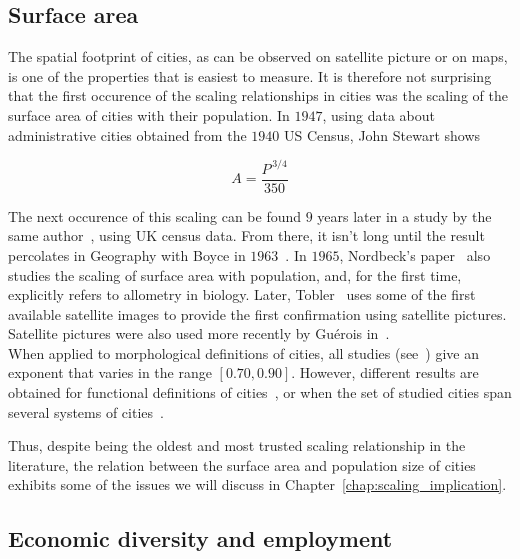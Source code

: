 \subsection{Surface area}
\label{sub:surface_area}

The spatial footprint of cities, as can be observed on satellite picture or on
maps, is one of the properties that is easiest to measure. It is therefore not
surprising that the first occurence of the scaling relationships in cities was
the scaling of the surface area of cities with their population. In $1947$,
using data about administrative cities obtained from the $1940$ US Census, John
Stewart shows

\begin{equation}
    A = \frac{P^{\,3/4}}{350}
\end{equation}

The next occurence of this scaling can be found $9$ years later in a study by
the same author~\cite{Stewart:1958}, using UK census data. From there, it isn't
long until the result percolates in Geography with Boyce in $1963$~\cite{Boyce:1963}.
In $1965$, Nordbeck's paper~\cite{Nordbeck:1965} also studies the scaling of surface area
with population, and, for the first time, explicitly refers to allometry in
biology. Later, Tobler~\cite{Tobler:1969} uses some of the first available
satellite images to provide the first confirmation using satellite pictures.
Satellite pictures were also used more recently by Gu\'erois in~\cite{Guerois:2003}.\\

When applied to morphological definitions of cities, all studies
(see~\cite{Batty:2011}) give an exponent that varies in the range $[0.70,
0.90]$. However, different results are obtained for functional definitions of
cities~\cite{Batty:2011}, or when the set of studied cities span several systems of
cities~\cite{Fuller:2009}.

Thus, despite being the oldest and most trusted scaling relationship in the
literature, the relation between the surface area and population size of cities
exhibits some of the issues we will discuss in
Chapter~\ref{chap:scaling_implication}.



\subsection{Economic diversity and employment}
\label{sub:economic_diversity}

